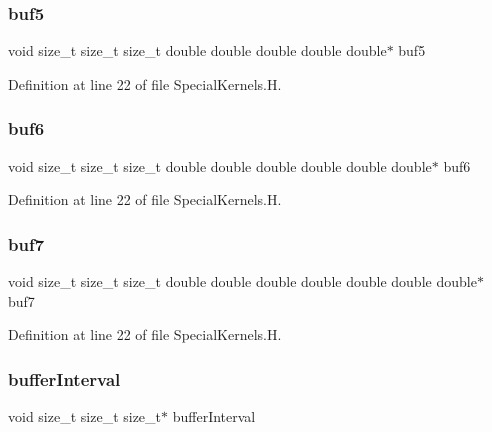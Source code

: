\hypertarget{SpecialKernels_8H_a1d9b2cc88189869440b6641628dea8a9}{}\label{SpecialKernels_8H_a1d9b2cc88189869440b6641628dea8a9} 
\subsubsection{\texorpdfstring{buf5}{buf5}}
{\footnotesize\ttfamily void size\+\_\+t size\+\_\+t size\+\_\+t double double double double double$\ast$ buf5}



Definition at line 22 of file Special\+Kernels.\+H.

\hypertarget{SpecialKernels_8H_a1ecfdf27819102af6ccae0762e607308}{}\label{SpecialKernels_8H_a1ecfdf27819102af6ccae0762e607308} 
\subsubsection{\texorpdfstring{buf6}{buf6}}
{\footnotesize\ttfamily void size\+\_\+t size\+\_\+t size\+\_\+t double double double double double double$\ast$ buf6}



Definition at line 22 of file Special\+Kernels.\+H.

\hypertarget{SpecialKernels_8H_a8562dabe2a78d45593422b8b1e4ef513}{}\label{SpecialKernels_8H_a8562dabe2a78d45593422b8b1e4ef513} 
\subsubsection{\texorpdfstring{buf7}{buf7}}
{\footnotesize\ttfamily void size\+\_\+t size\+\_\+t size\+\_\+t double double double double double double double$\ast$ buf7}



Definition at line 22 of file Special\+Kernels.\+H.

\hypertarget{SpecialKernels_8H_ac88f8e4ac8e529a4c4130ede15896339}{}\label{SpecialKernels_8H_ac88f8e4ac8e529a4c4130ede15896339} 
\subsubsection{\texorpdfstring{buffer\+Interval}{bufferInterval}}
{\footnotesize\ttfamily void size\+\_\+t size\+\_\+t size\+\_\+t$\ast$ buffer\+Interval}



